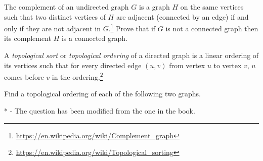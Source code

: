 \documentclass[addpoints]{exam}
\begin{document}
\begin{questions}
  The complement of an undirected graph $G$ is a graph $H$ on the same vertices such that two distinct vertices of $H$ are adjacent (connected by an edge) if and only if they are not adjacent in $G$.\footnote{\url{https://en.wikipedia.org/wiki/Complement_graph}} Prove that if $G$ is not a connected graph then its complement $H$ is a connected graph.
  \begin{solution}
  \end{solution}


  A {\it topological sort} or {\it topological ordering} of a directed graph is a linear ordering of its vertices such that for every directed edge $(u,v)$ from vertex $u$ to vertex $v$, $u$ comes before $v$ in the ordering.\footnote{\url{https://en.wikipedia.org/wiki/Topological_sorting}}

  Find a topological ordering of each of the following two graphs.

  
\end{questions}

* - The question has been modified from the one in the book.
\end{document}
